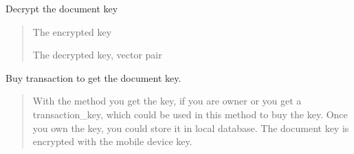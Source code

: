 \documentclass[letterpaper,10pt,english]{sphinxmanual}
\begin{document}
\begin{savenotes}
\begin{fulllineitems}
\begin{savenotes}\begin{fulllineitems}
\label{\detokenize{eezz:eezz.document.TDocuments.decrypt_key_with_device}}
\pysigstartsignatures
{}
\pysigstopsignatures
\sphinxAtStartPar
Decrypt the document key
\begin{quote}\begin{description}
\sphinxAtStartPar
{} \textendash{} The encrypted key

\sphinxAtStartPar
The decrypted key, vector pair

\end{description}\end{quote}

\end{fulllineitems}\end{savenotes}


\begin{savenotes}\begin{fulllineitems}
\label{\detokenize{eezz:eezz.document.TDocuments.eezz_buy_document}}
\pysigstartsignatures
{}
\pysigstopsignatures
\sphinxAtStartPar
Buy transaction to get the document key.
\begin{quote}\begin{description}
\sphinxAtStartPar
{} \textendash{} With the method  you get the         key, if you are owner or you get a transaction\_key, which could be used in this method to buy the key. Once         you own the key, you could store it in local database.         The document key is encrypted with the mobile device key.

\end{description}\end{quote}


\end{fulllineitems}
\end{savenotes}
\end{fulllineitems}
\end{savenotes}
\end{document}
